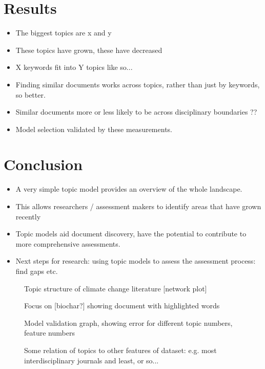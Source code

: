 \documentclass{article}
\begin{document}
\section{Results}
\begin{itemize}
	\item The biggest topics are x and y
	\item These topics have grown, these have decreased
    \item X keywords fit into Y topics like so...
    \item Finding similar documents works across topics, rather than just by keywords, so better.
    \item Similar documents more or less likely to be across disciplinary boundaries ??
    \item Model selection validated by these measurements.
\end{itemize}

\section{Conclusion}
\begin{itemize}
	\item A very simple topic model provides an overview of the whole landscape.
    \item This allows researchers / assessment makers to identify areas that have grown recently
    \item Topic models aid document discovery, have the potential to contribute to more comprehensive assessments.
    \item Next steps for research: using topic models to assess the assessment process: find gaps etc.
\end{itemize}

\begin{figure}
    \caption{Topic structure of climate change literature [network plot]}
\end{figure}


\begin{figure}
    \caption{Focus on [biochar?] showing document with highlighted words}
\end{figure}

\begin{figure}
    \caption{Model validation graph, showing error for different topic numbers, feature numbers}
\end{figure}


\begin{figure}
    \caption{Some relation of topics to other features of dataset: e.g. most interdisciplinary journals and least, or so...}
\end{figure}



\listoffigures



\end{document}
